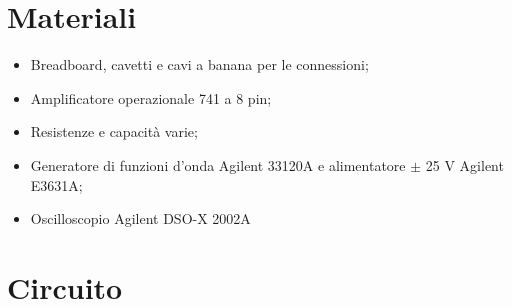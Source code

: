 \section*{Materiali}

\begin{itemize}
    \item{Breadboard, cavetti e cavi a banana per le connessioni;}
    \item{Amplificatore operazionale 741 a 8 pin;}
    \item{Resistenze e capacità varie;}
    \item{Generatore di funzioni d'onda Agilent 33120A e alimentatore $\pm$ 25 V Agilent E3631A;}
    \item{Oscilloscopio Agilent DSO-X 2002A}
\end{itemize}

\section*{Circuito}
